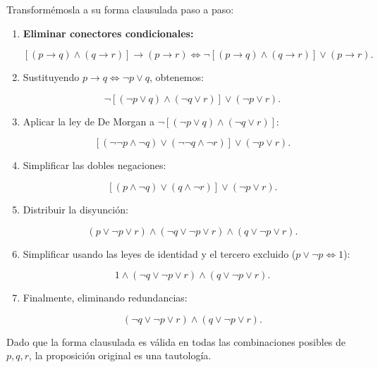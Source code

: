 Transformémosla a su forma clausulada paso a paso:
\begin{enumerate}
    \item \textbf{Eliminar conectores condicionales:}

    \[ [(p \to q) \land (q \to r)] \to (p \to r) \iff \neg [(p \to q) \land
    (q \to r)] \lor (p \to r). \]

    \item Sustituyendo \(p \to q \iff \neg p \lor q\), obtenemos:

    \[ \neg [(\neg p \lor q) \land (\neg q \lor r)] \lor (\neg p \lor r). \]

    \item Aplicar la ley de De Morgan a \(\neg [(\neg p \lor q) \land (\neg
      q \lor r)]\):

    \[ [(\neg \neg p \land \neg q) \lor (\neg \neg q \land \neg r)] \lor
    (\neg p \lor r). \]

    \item Simplificar las dobles negaciones:

    \[ [(p \land \neg q) \lor (q \land \neg r)] \lor (\neg p \lor r). \]

    \item Distribuir la disyunción:

    \[ (p \lor \neg p \lor r) \land (\neg q \lor \neg p \lor r) \land (q
    \lor \neg p \lor r). \]

    \item Simplificar usando las leyes de identidad y el tercero excluido
      (\(p \lor \neg p \iff 1\)):

    \[ 1 \land (\neg q \lor \neg p \lor r) \land (q \lor \neg p \lor r). \]

    \item Finalmente, eliminando redundancias:

    \[ (\neg q \lor \neg p \lor r) \land (q \lor \neg p \lor r). \]
\end{enumerate}

Dado que la forma clausulada es válida en todas las combinaciones posibles
de \(p, q, r\), la proposición original es una tautología.








